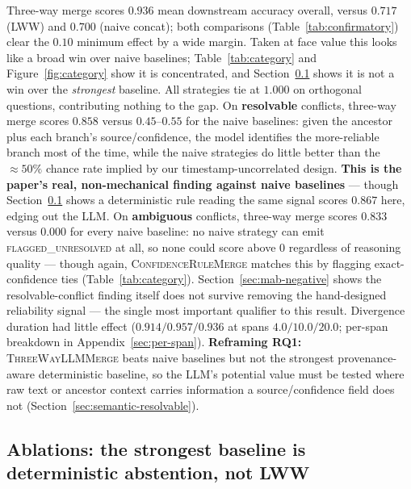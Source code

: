 \documentclass[11pt]{article}
\begin{document}
Three-way merge scores $0.936$ mean downstream accuracy overall, versus $0.717$
(LWW) and $0.700$ (naive concat); both comparisons (Table~\ref{tab:confirmatory})
clear the $0.10$ minimum effect by a wide margin. Taken at face value this looks
like a broad win over naive baselines; Table~\ref{tab:category} and
Figure~\ref{fig:category} show it is concentrated, and Section~\ref{sec:ablations}
shows it is not a win over the \emph{strongest} baseline. All strategies tie at
$1.000$ on orthogonal questions, contributing nothing to the gap. On
\textbf{resolvable} conflicts, three-way merge scores $0.858$ versus
$0.45$--$0.55$ for the naive baselines: given the ancestor plus each branch's
source/confidence, the model identifies the more-reliable branch most of the
time, while the naive strategies do little better than the $\approx50\%$
chance rate implied by our timestamp-uncorrelated design. \textbf{This is the
paper's real, non-mechanical finding against naive baselines} --- though
Section~\ref{sec:ablations} shows a deterministic rule reading the same
signal scores $0.867$ here, edging out the LLM. On \textbf{ambiguous}
conflicts, three-way merge scores $0.833$ versus $0.000$ for every naive
baseline: no naive strategy can emit \textsc{flagged\_unresolved} at all, so
none could score above $0$ regardless of reasoning quality --- though again,
\textsc{ConfidenceRuleMerge} matches this by flagging exact-confidence ties
(Table~\ref{tab:category}). Section~\ref{sec:mab-negative} shows the
resolvable-conflict finding itself does not survive removing the
hand-designed reliability signal --- the single most important qualifier to
this result. Divergence duration had little effect ($0.914/0.957/0.936$ at
spans $4.0/10.0/20.0$; per-span breakdown in Appendix~\ref{sec:per-span}).
\textbf{Reframing RQ1:} \textsc{ThreeWayLLMMerge} beats naive baselines but
not the strongest provenance-aware deterministic baseline, so the LLM's
potential value must be tested where raw text or ancestor context carries
information a source/confidence field does not
(Section~\ref{sec:semantic-resolvable}).

\subsection{Ablations: the strongest baseline is deterministic abstention, not LWW}
\label{sec:ablations}
\end{document}
